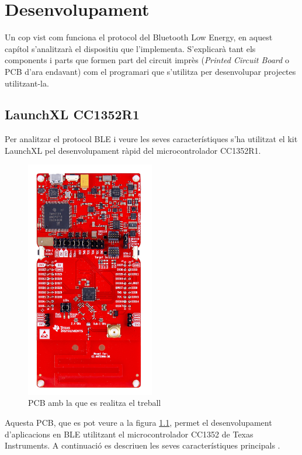 \chapter{Desenvolupament}
Un cop vist com funciona el protocol del Bluetooth Low Energy, en aquest capítol s'analitzarà el dispositiu que l'implementa.
S'explicarà tant els components i parts que formen part del circuit imprès (\textit{Printed Circuit Board} o PCB d'ara endavant) com el programari que s'utilitza per desenvolupar projectes utilitzant-la.

\section{LaunchXL CC1352R1}
Per analitzar el protocol BLE i veure les seves característiques s'ha utilitzat el kit LaunchXL pel desenvolupament ràpid del microcontrolador CC1352R1.

\begin{figure}[h!]
	\begin{center}
		\includegraphics[width=0.5\textwidth]{./images/launchxl-cc1352r1.jpg}
		\caption{PCB amb la que es realitza el treball \cite{placa}}
		\label{PCB}
	\end{center}
\end{figure}

Aquesta PCB, que es pot veure a la figura \ref{PCB}, permet el desenvolupament d'aplicacions en BLE utilitzant el microcontrolador CC1352 de Texas Instruments.
A continuació es descriuen les seves característiques principals \cite{placa_datasheet}.

